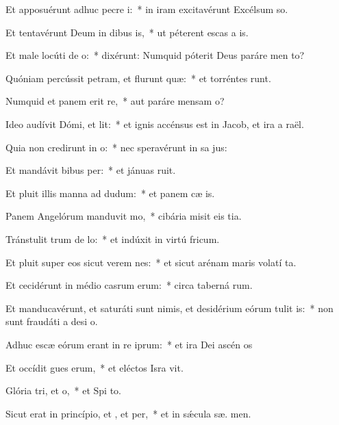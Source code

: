 \item Et apposuérunt adhuc pecre i:~* in iram excitavérunt Excélsum  so.
\item Et tentavérunt Deum in dibus is,~* ut péterent escas a is.
\item Et male locúti  de o:~* dixérunt: Numquid póterit Deus paráre men  to?
\item Quóniam percússit petram, et flurunt quæ:~* et torréntes runt.
\item Numquid et panem erit re,~* aut paráre mensam  o?
\item Ideo audívit Dómi, et lit:~* et ignis accénsus est in Jacob, et ira a  raël.
\item Quia non credirunt in o:~* nec speravérunt in sa jus:
\item Et mandávit bibus per:~* et jánuas  ruit.
\item Et pluit illis manna ad dudum:~* et panem cæ  is.
\item Panem Angelórum manduvit mo,~* cibária misit eis  tia.
\item Tránstulit trum de lo:~* et indúxit in virtú  fricum.
\item Et pluit super eos sicut verem nes:~* et sicut arénam maris volatí ta.
\item Et cecidérunt in médio casrum erum:~* circa taberná rum.
\item Et manducavérunt, et saturáti sunt nimis, et desidérium eórum tulit is:~* non sunt fraudáti a desi o.
\item Adhuc escæ eórum erant in re iprum:~* et ira Dei ascén  os
\item Et occídit gues erum,~* et eléctos Isra vit.
\item Glória tri, et o,~* et Spi to.
\item Sicut erat in princípio, et , et per,~* et in sǽcula sæ. men.
